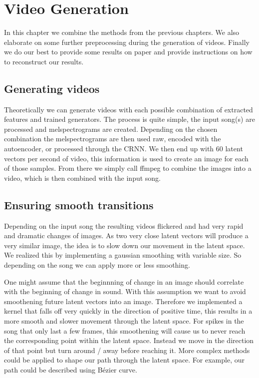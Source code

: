 \chapter{Video Generation}\label{ch:results}

    In this chapter we combine the methods from the previous chapters. We also elaborate on some further preprocessing during the generation of videos. Finally we do our best to provide some results on paper and provide instructions on how to reconstruct our results.

    \section{Generating videos}
        
        Theoretically we can generate videos with each possible combination of extracted features and trained generators. The process is quite simple, the input song(s) are processed and melspectrograms are created. Depending on the chosen combination the melspectrograms are then used raw, encoded with the autoencoder, or processed through the CRNN. We then end up with 60 latent vectors per second of video, this information is used to create an image for each of those samples. From there we simply call ffmpeg to combine the images into a video, which is then combined with the input song.

    \section{Ensuring smooth transitions}
        
        Depending on the input song the resulting videos flickered and had very rapid and dramatic changes of images. As two very close latent vectors will produce a very similar image, the idea is to slow down our movement in the latent space. We realized this by implementing a gaussian smoothing with variable size. So depending on the song we can apply more or less smoothing.
        
        One might assume that the beginnning of change in an image should correlate with the beginning of change in sound. With this assumption we want to avoid smoothening future latent vectors into an image. Therefore we implemented a kernel that falls off very quickly in the direction of positive time, this results in a more smooth and slower movement through the latent space. For spikes in the song that only last a few frames, this smoothening will cause us to never reach the corresponding point within the latent space. Instead we move in the direction of that point but turn around / away before reaching it. More complex methods could be applied to shape our path through the latent space. For example, our path could be described using Bézier curve.

